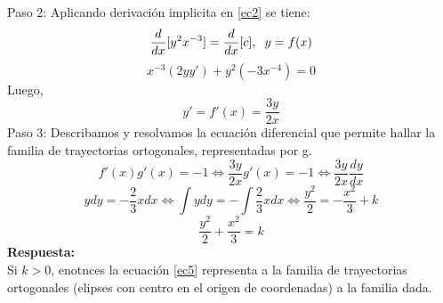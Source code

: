 \documentclass[12pt,letterpaper]{article}
\begin{document}
\begin{titlepage}
\begin{flushleft}
Paso 2: Aplicando derivación implicita en \eqref{ec2} se tiene:
\begin{equation*} 
\dfrac{d}{dx} [y^{2}x^{-3}] = \dfrac{d}{dx} [c],\hspace{0.2cm} y = f(x)
\end{equation*}
\begin{equation} \tag{3} \label{ec3}
x^{-3}(2yy') + y^{2}(-3x^{-4}) = 0
\end{equation}
Luego,\\
\begin{equation} \tag{4} \label{ec4}
y' = f'(x) = \dfrac{3y}{2x}
\end{equation}
Paso 3: Describamos y resolvamos la ecuación diferencial que permite hallar la familia de trayectorias ortogonales, representadas por g.
\begin{equation*}
f'(x)g'(x) = -1 \Leftrightarrow \dfrac{3y}{2x}g'(x)=-1 \Leftrightarrow \dfrac{3y}{2x} \frac{dy}{dx} \tag {edvs}
\end{equation*}
\begin{equation*}
ydy = - \dfrac{2}{3} xdx \Leftrightarrow \int ydy = - \int \frac{2}{3} xdx \Leftrightarrow \frac{y^{2}}{2} = -\dfrac{x^{2}}{3} + k
\end{equation*}
\begin{equation} \tag{5} \label{ec5}
\frac{y^{2}}{2} + \frac{x^{2}}{3} = k 
\end{equation}
\textbf{Respuesta:}\\
\vspace{0.5cm}
Si $k > 0$, enotnces la ecuación \eqref{ec5} representa a la familia de trayectorias ortogonales (elipses con centro en el origen de coordenadas) a la familia dada.
\end{flushleft}
\end{titlepage}
\end{document}

